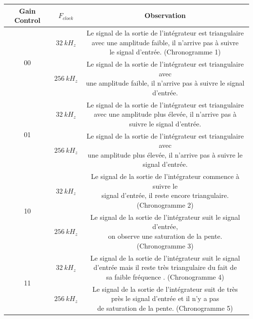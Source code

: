 \documentclass[11pt, openright]{book}
\begin{document}
\begin{center}
    \begin{tabular}{c|c|c}
        Gain Control        & $F_{clock}$ & Observation                                                                \\
        \hline
        \multirow{2}{*}{00} & $32\ kH_z$  & \makecell{Le signal de la sortie de l’intégrateur est triangulaire         \\ avec une amplitude faible, il n’arrive pas à suivre\\ le signal d’entrée. (Chronogramme 1)}\\
        \cline{2-3}
                            & $256\ kH_z$ & \makecell{Le signal de la sortie de l’intégrateur est triangulaire avec    \\ une amplitude faible, il n’arrive pas à suivre le signal d’entrée.}\\
        \hline
        \multirow{2}{*}{01} & $32\ kH_z$  & \makecell{Le signal de la sortie de l’intégrateur est triangulaire         \\ avec une amplitude plus élevée, il n’arrive pas à\\ suivre le signal d’entrée.}\\
        \cline{2-3}
                            & $256\ kH_z$ & \makecell{Le signal de la sortie de l’intégrateur est triangulaire avec    \\ une amplitude plus élevée, il n’arrive pas à suivre le signal d’entrée.}\\
        \hline
        \multirow{2}{*}{10} & $32\ kH_z$  & \makecell{Le signal de la sortie de l’intégrateur commence à suivre le     \\ signal d’entrée, il reste encore triangulaire. (Chronogramme 2) }\\
        \cline{2-3}
                            & $256\ kH_z$ & \makecell{Le signal de la sortie de l’intégrateur suit le signal d’entrée, \\ on observe une saturation de la pente. (Chronogramme 3)} \\
        \hline
        \multirow{2}{*}{11} & $32\ kH_z$  & \makecell{Le signal de la sortie de l’intégrateur suit le signal           \\ d’entrée mais il reste très triangulaire du fait de\\ sa faible fréquence . (Chronogramme 4)}\\
        \cline{2-3}
                            & $256\ kH_z$ & \makecell{Le signal de la sortie de l’intégrateur suit de très             \\ près le signal d’entrée et il n’y a pas\\ de saturation de la pente. (Chronogramme 5)} \\
    \end{tabular}
\end{center}
\end{document}
